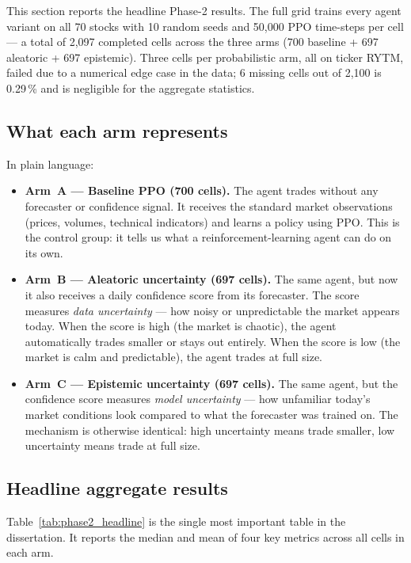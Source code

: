 This section reports the headline Phase-2 results. The full grid trains every agent variant on all 70 stocks with 10 random seeds and 50,000 PPO time-steps per cell --- a total of 2,097 completed cells across the three arms (700 baseline + 697 aleatoric + 697 epistemic). Three cells per probabilistic arm, all on ticker RYTM, failed due to a numerical edge case in the data; 6 missing cells out of 2,100 is 0.29\,\% and is negligible for the aggregate statistics.

\subsection{What each arm represents}

In plain language:

\begin{itemize}[leftmargin=*]
  \item \textbf{Arm~A --- Baseline PPO (700 cells).} The agent trades without any forecaster or confidence signal. It receives the standard market observations (prices, volumes, technical indicators) and learns a policy using PPO. This is the control group: it tells us what a reinforcement-learning agent can do on its own.

  \item \textbf{Arm~B --- Aleatoric uncertainty (697 cells).} The same agent, but now it also receives a daily confidence score from its forecaster. The score measures \emph{data uncertainty} --- how noisy or unpredictable the market appears today. When the score is high (the market is chaotic), the agent automatically trades smaller or stays out entirely. When the score is low (the market is calm and predictable), the agent trades at full size.

  \item \textbf{Arm~C --- Epistemic uncertainty (697 cells).} The same agent, but the confidence score measures \emph{model uncertainty} --- how unfamiliar today's market conditions look compared to what the forecaster was trained on. The mechanism is otherwise identical: high uncertainty means trade smaller, low uncertainty means trade at full size.
\end{itemize}

\subsection{Headline aggregate results}

Table~\ref{tab:phase2_headline} is the single most important table in the dissertation. It reports the median and mean of four key metrics across all cells in each arm.

